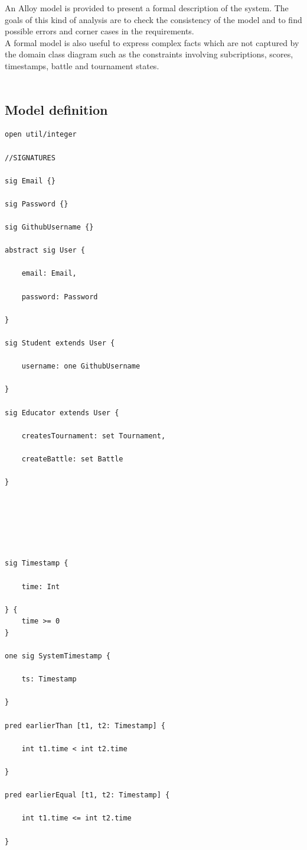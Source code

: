 An Alloy model is provided to present a formal description of the system. 
The goals of this kind of analysis are to check the consistency of the model and to find possible errors and corner cases in the requirements.\\
A formal model is also useful to express complex facts which are not captured by the domain class diagram such as the constraints involving subcriptions, scores, timestamps, battle and tournament states.\\ \\

\subsection{Model definition}
\begin{lstlisting}[language=alloy]
open util/integer

//SIGNATURES

sig Email {}

sig Password {}

sig GithubUsername {}

abstract sig User {

    email: Email,

    password: Password

}

sig Student extends User {

    username: one GithubUsername

}

sig Educator extends User {

    createsTournament: set Tournament,

    createBattle: set Battle

}






sig Timestamp {

    time: Int

} { 
    time >= 0 
}

one sig SystemTimestamp {

    ts: Timestamp

}

pred earlierThan [t1, t2: Timestamp] {

    int t1.time < int t2.time

}

pred earlierEqual [t1, t2: Timestamp] {

    int t1.time <= int t2.time

}


\end{lstlisting}
